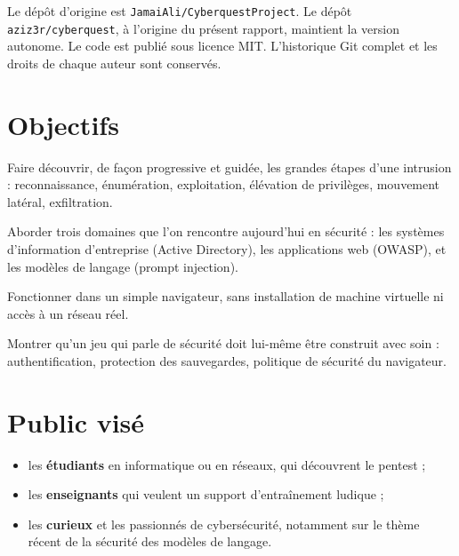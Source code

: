 \documentclass[11pt,a4paper]{report}
\begin{document}
Le d\'ep\^ot d'origine est \texttt{JamaiAli/CyberquestProject}. Le d\'ep\^ot
\texttt{aziz3r/cyberquest}, \`a l'origine du pr\'esent rapport, maintient la version
autonome. Le code est publi\'e sous licence MIT. L'historique Git complet et les droits
de chaque auteur sont conserv\'es.

\section{Objectifs}

\begin{description}[style=nextline,leftmargin=0.6cm]
  \item[Objectif p\'edagogique] Faire d\'ecouvrir, de fa\c con progressive et guid\'ee, les
        grandes \'etapes d'une intrusion : reconnaissance, \'enum\'eration, exploitation,
        \'el\'evation de privil\`eges, mouvement lat\'eral, exfiltration.
  \item[Objectif de couverture] Aborder trois domaines que l'on rencontre
        aujourd'hui en s\'ecurit\'e : les syst\`emes d'information d'entreprise
        (Active Directory), les applications web (OWASP), et les mod\`eles de
        langage (prompt injection).
  \item[Objectif d'accessibilit\'e] Fonctionner dans un simple navigateur, sans
        installation de machine virtuelle ni acc\`es \`a un r\'eseau r\'eel.
  \item[Objectif d'ing\'enierie] Montrer qu'un jeu qui parle de s\'ecurit\'e doit lui-m\^eme
        \^etre construit avec soin : authentification, protection des sauvegardes,
        politique de s\'ecurit\'e du navigateur.
\end{description}

\section{Public vis\'e}

\begin{itemize}
  \item les \textbf{\'etudiants} en informatique ou en r\'eseaux, qui d\'ecouvrent le pentest ;
  \item les \textbf{enseignants} qui veulent un support d'entra\^inement ludique ;
  \item les \textbf{curieux} et les passionn\'es de cybers\'ecurit\'e, notamment sur le
        th\`eme r\'ecent de la s\'ecurit\'e des mod\`eles de langage.
\end{itemize}
\end{document}
